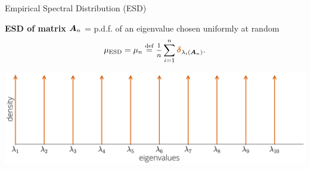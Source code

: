 \documentclass[10pt, aspectratio=169]{beamer}
\begin{document}
\begin{frame}{Empirical Spectral Distribution (ESD)}


\textbf{ESD of matrix $\AA_n$} = p.d.f. of an eigenvalue chosen uniformly at random
\[\mu_{\text{ESD}} = \mu_{n} \defas \mfrac{1}{n} \sum_{i=1}^n {\color{myorange}{\boldsymbol\delta}}_{\lambda_i(\AA_n)}.\]
\begin{center}
\includegraphics[width=0.8\linewidth]{part-1-images/esd.pdf}
\end{center}
\end{frame}
\end{document}
